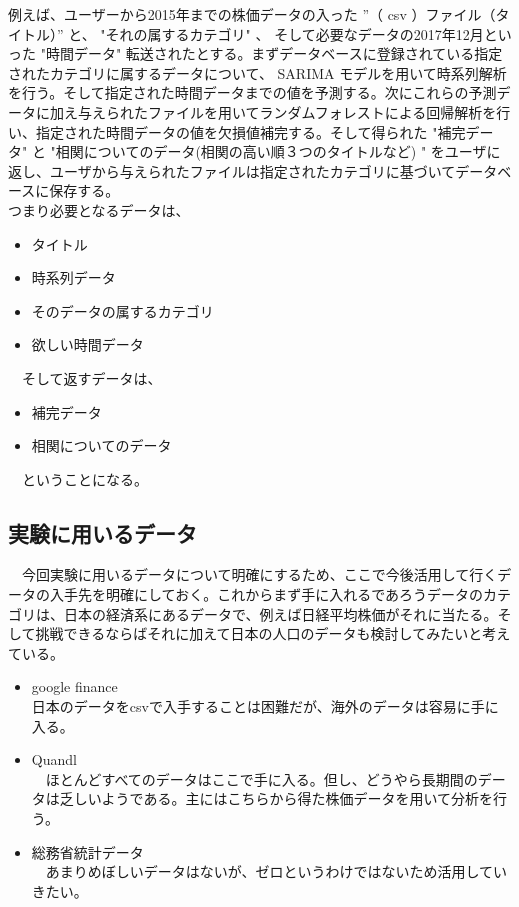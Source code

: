 \documentclass{scrartcl}
\begin{document}
例えば、ユーザーから2015年までの株価データの入った ”（ csv ）ファイル（タイトル）” と、 "それの属するカテゴリ" 、 そして必要なデータの2017年12月といった "時間データ" 転送されたとする。まずデータベースに登録されている指定されたカテゴリに属するデータについて、 SARIMA モデルを用いて時系列解析を行う。そして指定された時間データまでの値を予測する。次にこれらの予測データに加え与えられたファイルを用いてランダムフォレストによる回帰解析を行い、指定された時間データの値を欠損値補完する。そして得られた "補完データ" と "相関についてのデータ(相関の高い順３つのタイトルなど) " をユーザに返し、ユーザから与えられたファイルは指定されたカテゴリに基づいてデータベースに保存する。\\

つまり必要となるデータは、\\
\begin{itemize}
\item タイトル\\
\item 時系列データ\\
\item そのデータの属するカテゴリ\\
\item 欲しい時間データ\\
\end{itemize}

　そして返すデータは、\\
\begin{itemize}
\item 補完データ\\
\item 相関についてのデータ\\
\end{itemize}

　ということになる。\\

\subsection{実験に用いるデータ}
\label{sec:org843c1c5}
　今回実験に用いるデータについて明確にするため、ここで今後活用して行くデータの入手先を明確にしておく。これからまず手に入れるであろうデータのカテゴリは、日本の経済系にあるデータで、例えば日経平均株価がそれに当たる。そして挑戦できるならばそれに加えて日本の人口のデータも検討してみたいと考えている。\\
\begin{itemize}
\item google finance\\
日本のデータをcsvで入手することは困難だが、海外のデータは容易に手に入る。\\
\item Quandl\\
　ほとんどすべてのデータはここで手に入る。但し、どうやら長期間のデータは乏しいようである。主にはこちらから得た株価データを用いて分析を行う。\\
\item 総務省統計データ\\
　あまりめぼしいデータはないが、ゼロというわけではないため活用していきたい。\\
\end{itemize}
\end{document}
